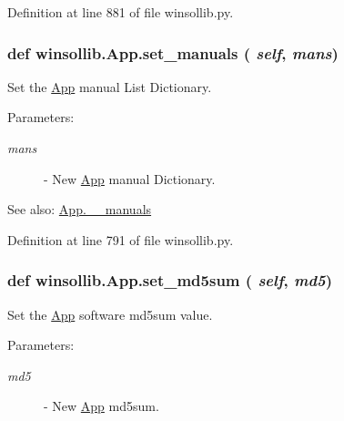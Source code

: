 Definition at line 881 of file winsollib.py.\hypertarget{classwinsollib_1_1App_6784e178b869d2637ca9901245bf5e66}{
\subsubsection[set\_\-manuals]{\setlength{\rightskip}{0pt plus 5cm}def winsollib.App.set\_\-manuals ( {\em self},  {\em mans})}}
\label{classwinsollib_1_1App_6784e178b869d2637ca9901245bf5e66}


Set the \hyperlink{classwinsollib_1_1App}{App} manual List Dictionary. 

\begin{Desc}
\item[Parameters:]
\begin{description}
\item[{\em mans}]- New \hyperlink{classwinsollib_1_1App}{App} manual Dictionary.\end{description}
\end{Desc}
\begin{Desc}
\item[See also:]\hyperlink{classwinsollib_1_1App_1af4cfd72ef4f2e4ce69304a2aa34b5f}{App.\_\-\_\-manuals} \end{Desc}


Definition at line 791 of file winsollib.py.\hypertarget{classwinsollib_1_1App_212c0f8cd2f5941d3fbb9e3cb31ae019}{
\subsubsection[set\_\-md5sum]{\setlength{\rightskip}{0pt plus 5cm}def winsollib.App.set\_\-md5sum ( {\em self},  {\em md5})}}
\label{classwinsollib_1_1App_212c0f8cd2f5941d3fbb9e3cb31ae019}


Set the \hyperlink{classwinsollib_1_1App}{App} software md5sum value. 

\begin{Desc}
\item[Parameters:]
\begin{description}
\item[{\em md5}]- New \hyperlink{classwinsollib_1_1App}{App} md5sum. \end{description}
\end{Desc}


